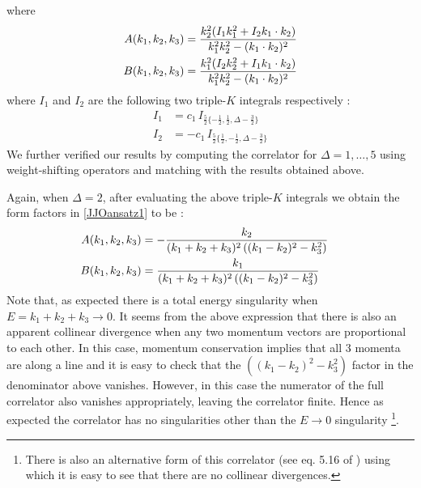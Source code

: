 \documentclass[a4paper,11pt]{article}
\begin{document}
where 
%
\begin{align}
    A(k_1,k_2,k_3)=\frac{k_2^2(I_1k_1^2+I_2k_1\cdot k_2)}{k_1^2k_2^2-(k_1\cdot k_2)^2}\cr
    B(k_1,k_2,k_3)=\frac{k_1^2(I_2k_2^2+I_1k_1\cdot k_2)}{k_1^2k_2^2-(k_1\cdot k_2)^2}
\end{align}
%
where $I_1$ and $I_2$ are the following two triple-$K$ integrals respectively :
\begin{align}
I_1&=c_1\,I_{\frac{5}{2}\{-\frac{1}{2},\frac{1}{2},\Delta-\frac 32\}} \\
I_2&=-c_1\,I_{\frac{5}{2}\{\frac{1}{2},-\frac{1}{2},\Delta-\frac 32\}} 
\end{align}
We further verified our results by computing the correlator for $\Delta=1,\ldots,5$ using weight-shifting operators and matching with the results obtained above.

Again, when $\Delta=2$, after evaluating the above triple-$K$ integrals we obtain the form factors in \eqref{JJOansatz1} to be :
%
\begin{align}\label{JJOff}
    A(k_1,k_2,k_3)&=-\frac{k_2}{(k_1+k_2+k_3)^2\left((k_1-k_2)^2-k_3^2\right)}\cr
     B(k_1,k_2,k_3)&=\frac{k_1}{(k_1+k_2+k_3)^2\left((k_1-k_2)^2-k_3^2\right)}
    \end{align}
%
Note that, as expected there is a total energy singularity when $E=k_1+k_2+k_3 \rightarrow 0$. It seems from the above expression that there is also an apparent collinear divergence when any two momentum vectors are proportional to each other. In this case, momentum conservation implies that all 3 momenta are along a line and it is easy to check that the $((k_1-k_2)^2 -k_3^2)$ factor in the denominator above vanishes. However, in this case the numerator of the full correlator also vanishes appropriately,
leaving the correlator finite. Hence as expected the correlator has no singularities other than the $E\rightarrow 0$ singularity \footnote{There is also an alternative form of this correlator (see eq. 5.16 of \cite{Jain:2021wyn}) using which it is easy to see that there are no collinear divergences.}.
\end{document}
